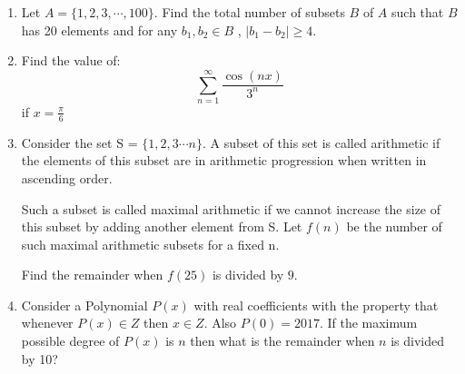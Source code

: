 \documentclass[a4paper]{article}
\begin{document}
\begin{enumerate}
\item Let $A = \lbrace{1,2,3, \cdots , 100} \rbrace$. Find the total number of subsets $B$ of $A$ such that $B$ has 20 elements and for any $b_1,b_2 \in B$ , $|b_1 - b_2| \ge 4$.

\item Find the value of:
$$ \sum_{n=1}^{\infty}\frac{\cos(nx)} {3^n} $$ if $x = \frac{\pi}{6}$

\item Consider the set S = $\lbrace{
1, 2, 3 \cdots n} \rbrace$. A subset of this set is called arithmetic if the elements of this subset are in arithmetic progression when written in ascending order. 

Such a subset is called maximal arithmetic if we cannot increase the size of this subset by adding another element from S. Let $f(n)$ be the number of such maximal arithmetic subsets for a fixed n.

Find the remainder when $f(25)$ is divided by $9$.

\item Consider a Polynomial $P(x)$ with real coefficients with the property that whenever $P(x) \in Z $ then $ x \in Z $. Also $P(0) = 2017$. If the maximum possible degree of $P(x)$ is $n$ then what is the remainder when $n$ is divided by 10?
\end{enumerate}
\end{document}
